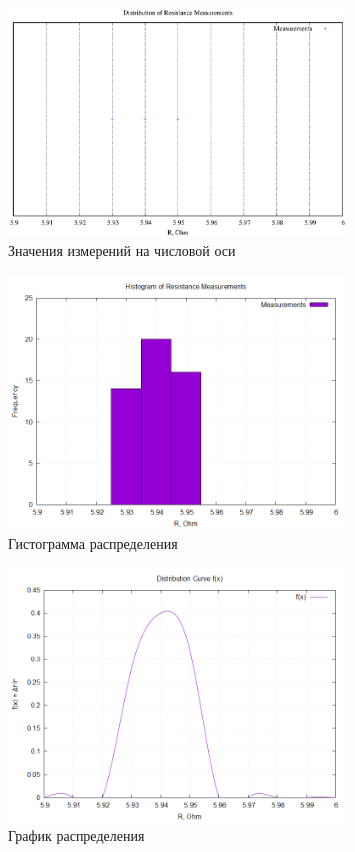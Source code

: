 \begin{figure}[ht!]
\centering
\includegraphics[width=0.8\textwidth]{resistance_distribution}
\caption{Значения измерений на числовой оси}
\label{fig:plot}
\end{figure}

\begin{figure}[ht!]
\centering
\includegraphics[width=0.8\textwidth]{resistance_histogram}
\caption{Гистограмма распределения}
\label{fig:plot}
\end{figure}
\newpage
\begin{figure}[ht!]
\centering
\includegraphics[width=0.8\textwidth]{distribution_curve}
\caption{График распределения}
\label{fig:plot}
\end{figure}

